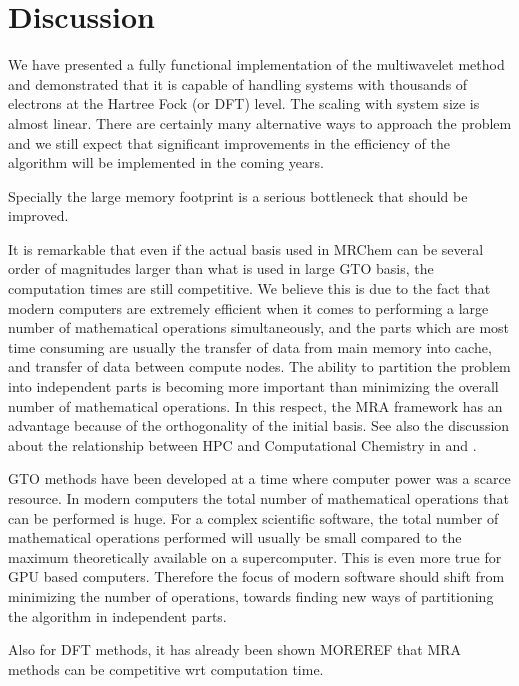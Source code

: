 \documentclass{article}
\begin{document}

\section{Discussion}
We have presented a fully functional implementation of the multiwavelet method and demonstrated that it is capable of handling systems with thousands of electrons at the Hartree Fock (or DFT) level. The scaling with system size is almost linear. There are certainly many alternative ways to approach the problem and we still expect that significant improvements in the efficiency of the algorithm will be implemented in the coming years. 

Specially the large memory footprint is a serious bottleneck that should be improved. %

It is remarkable that even if the actual basis used in MRChem can be several order of magnitudes larger than what is used in large GTO basis, the computation times are still competitive. We believe this is due to the fact that modern computers are extremely efficient when it comes to performing a large number of mathematical operations simultaneously, and the parts which are most time consuming are usually the transfer of data from main memory into cache, and transfer of data between compute nodes. The ability to partition the problem into independent parts is becoming more important than minimizing the overall number of mathematical operations. In this respect, the MRA framework has an advantage because of the orthogonality of the initial basis. See also the discussion about the relationship between HPC and Computational Chemistry in \cite{penchoff2021} and \cite{ratcliff2016}.

GTO methods have been developed at a time where computer power was a scarce resource. In modern computers the total number of mathematical operations that can be performed is huge. For a complex scientific software, the total number of mathematical operations performed will usually be small compared to the maximum theoretically available on a supercomputer. This is even more true for GPU based computers. Therefore the focus of modern software should shift from minimizing the number of operations, towards finding new ways of partitioning the algorithm in independent parts.

Also for DFT methods, it has already been shown \cite{bischoff2019} MOREREF that MRA methods can be competitive wrt computation time.
\end{document}
